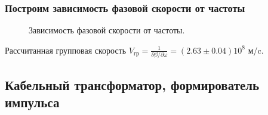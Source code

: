 \documentclass[12pt]{article}
\begin{document}
\begin{flushleft}
\subsubsection{Построим зависимость фазовой скорости от частоты}
\begin{figure}[!h]
\caption{Зависимость фазовой скорости от частоты.}
\label{ris:image}
\end{figure}
Рассчитанная групповая скорость $V_{\text{гр}}= \frac{1}{\partial \beta / \partial \omega} = (2.63 \pm 0.04) 10^8$ м/c.
\subsection{Кабельный трансформатор, формирователь импульса}

\end{flushleft}
\end{document}
